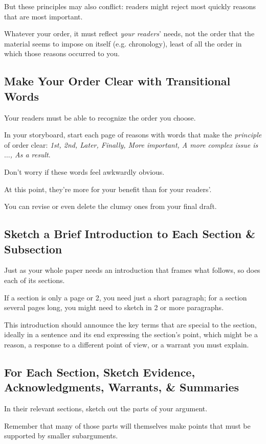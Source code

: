 \documentclass[oneside]{book}
\numberwithin{equation}{section}
\begin{document}
But these principles may also conflict: readers might reject most quickly reasons that are most important.

Whatever your order, it must reflect \textit{your readers}' needs, not the order that the material seems to impose on itself (e.g. chronology), least of all the order in which those reasons occurred to you.

\subsection{Make Your Order Clear with Transitional Words}
Your readers must be able to recognize the order you choose.

In your storyboard, start each page of reasons with words that make the \textit{principle} of order clear: \textit{1st, 2nd, Later, Finally, More important, A more complex issue is$\ldots$, As a result}.

Don't worry if these words feel awkwardly obvious.

At this point, they're more for your benefit than for your readers'.

You can revise or even delete the clumsy ones from your final draft.

\subsection{Sketch a Brief Introduction to Each Section \& Subsection}
Just as your whole paper needs an introduction that frames what follows, so does each of its sections.

If a section is only a page or 2, you need just a short paragraph; for a section several pages long, you might need to sketch in 2 or more paragraphs.

This introduction should announce the key terms that are special to the section, ideally in a sentence and its end expressing the section's point, which might be a reason, a response to a different point of view, or a warrant you must explain.

\subsection{For Each Section, Sketch Evidence, Acknowledgments, Warrants, \& Summaries}
In their relevant sections, sketch out the parts of your argument.

Remember that many of those parts will themselves make points that must be supported by smaller subarguments.
\end{document}
